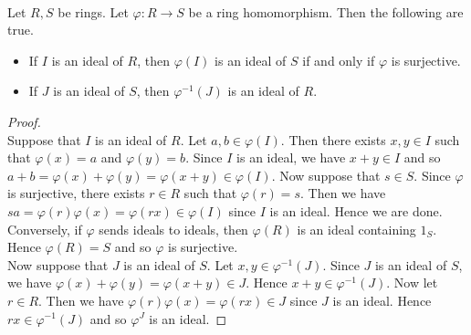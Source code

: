 \documentclass[a4paper]{article}
\begin{document}
\begin{lmm}{}{}\\
Let $R,S$ be rings. Let $\varphi:R\to S$ be a ring homomorphism. Then the following are true. 
\begin{itemize}
\item If $I$ is an ideal of $R$, then $\varphi(I)$ is an ideal of $S$ if and only if $\varphi$ is surjective. 
\item If $J$ is an ideal of $S$, then $\varphi^{-1}(J)$ is an ideal of $R$. 
\end{itemize} 
\begin{proof}\\
Suppose that $I$ is an ideal of $R$. Let $a,b\in\varphi(I)$. Then there exists $x,y\in I$ such that $\varphi(x)=a$ and $\varphi(y)=b$. Since $I$ is an ideal, we have $x+y\in I$ and so $a+b=\varphi(x)+\varphi(y)=\varphi(x+y)\in\varphi(I)$. Now suppose that $s\in S$. Since $\varphi$ is surjective, there exists $r\in R$ such that $\varphi(r)=s$. Then we have $sa=\varphi(r)\varphi(x)=\varphi(rx)\in\varphi(I)$ since $I$ is an ideal. Hence we are done. \\

Conversely, if $\varphi$ sends ideals to ideals, then $\varphi(R)$ is an ideal containing $1_S$. Hence $\varphi(R)=S$ and so $\varphi$ is surjective. \\

Now suppose that $J$ is an ideal of $S$. Let $x,y\in\varphi^{-1}(J)$. Since $J$ is an ideal of $S$, we have $\varphi(x)+\varphi(y)=\varphi(x+y)\in J$. Hence $x+y\in\varphi^{-1}(J)$. Now let $r\in R$. Then we have $\varphi(r)\varphi(x)=\varphi(rx)\in J$ since $J$ is an ideal. Hence $rx\in\varphi^{-1}(J)$ and so $\varphi^{J}$ is an ideal. 
\end{proof}
\end{lmm}
\end{document}
